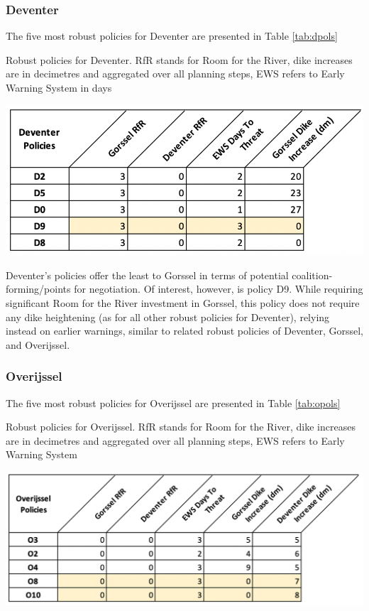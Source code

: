 \subsubsection{Deventer}
The five most robust policies for Deventer are presented in Table \ref{tab:dpols}

\begin{table}[h!]
  \centering
  \captionsetup{justification=centering,margin=2cm}
  \caption{Robust policies for Deventer. RfR stands for Room for the River, dike increases are in decimetres and aggregated over all planning steps, EWS refers to Early Warning System in days}
  \label{tab:dpols}
  \includegraphics[width=0.8\linewidth]{report/figures/dpols.png}
\end{table}

Deventer's policies offer the least to Gorssel in terms of potential coalition-forming/points for negotiation. Of interest, however, is policy D9. While requiring significant Room for the River investment in Gorssel, this policy does not require any dike heightening (as for all other robust policies for Deventer), relying instead on earlier warnings, similar to related robust policies of Deventer, Gorssel, and Overijssel.

\subsubsection{Overijssel}
The five most robust policies for Overijssel are presented in Table \ref{tab:opols}

\begin{table}[h!]
  \centering
  \captionsetup{justification=centering,margin=2cm}
  \caption{Robust policies for Overijssel. RfR stands for Room for the River, dike increases are in decimetres and aggregated over all planning steps, EWS refers to Early Warning System}
  \label{tab:opols}
  \includegraphics[width=0.8\linewidth]{report/figures/opols.png}
\end{table}

